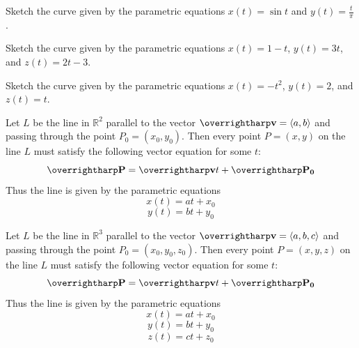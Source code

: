 \documentclass[letterpaper, twoside, 12pt]{book}
\begin{document}
          \begin{solution}

          \end{solution}

          \begin{problem}
            Sketch the curve given by the parametric equations
            $x(t)=\sin t$ and $y(t)=\frac{t}{\pi}$.
          \end{problem}

          \begin{solution}

          \end{solution}

          \begin{problem}
            Sketch the curve given by the parametric equations
            $x(t)=1-t$, $y(t)=3t$, and $z(t)=2t-3$.
          \end{problem}

          \begin{solution}

          \end{solution}

          \begin{problem}
            Sketch the curve given by the parametric equations
            $x(t)=-t^2$, $y(t)=2$, and $z(t)=t$.
          \end{problem}

          \begin{solution}

          \end{solution}



\begin{theorem}
  Let $L$ be the line in $\mathbb R^2$ parallel to the vector $\harpvec v=\<a,b\>$
  and passing through the point $P_0=(x_0,y_0)$. Then every point $P=(x,y)$
  on the line $L$ must satisfy the following vector equation for some $t$:
  \[
    \harpvec{P} = \harpvec{v}t + \harpvec{P_0}
  \]
  Thus the line is given by the parametric equations
  \[
    x(t) = at + x_0
  \]
  \[
    y(t) = bt + y_0
  \]

  Let $L$ be the line in $\mathbb R^3$ parallel to the vector $\harpvec v=\<a,b,c\>$
  and passing through the point $P_0=(x_0,y_0,z_0)$. Then every point $P=(x,y,z)$
  on the line $L$ must satisfy the following vector equation for some $t$:
  \[
    \harpvec{P} = \harpvec{v}t + \harpvec{P_0}
  \]
  Thus the line is given by the parametric equations
  \[
    x(t) = at + x_0
  \]
  \[
    y(t) = bt + y_0
  \]
  \[
    z(t) = ct + z_0
  \]
\end{theorem}
\end{document}

